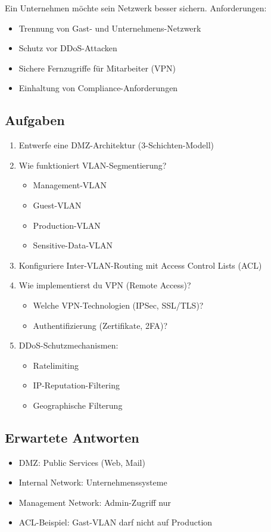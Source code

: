 \documentclass[12pt,a4paper,german]{report}
\begin{document}
Ein Unternehmen möchte sein Netzwerk besser sichern. Anforderungen:
\begin{itemize}
    \item Trennung von Gast- und Unternehmens-Netzwerk
    \item Schutz vor DDoS-Attacken
    \item Sichere Fernzugriffe für Mitarbeiter (VPN)
    \item Einhaltung von Compliance-Anforderungen
\end{itemize}

\subsection{Aufgaben}
\begin{enumerate}
    \item Entwerfe eine DMZ-Architektur (3-Schichten-Modell)
    \item Wie funktioniert VLAN-Segmentierung?
    \begin{itemize}
        \item Management-VLAN
        \item Guest-VLAN
        \item Production-VLAN
        \item Sensitive-Data-VLAN
    \end{itemize}
    \item Konfiguriere Inter-VLAN-Routing mit Access Control Lists (ACL)
    \item Wie implementierst du VPN (Remote Access)?
    \begin{itemize}
        \item Welche VPN-Technologien (IPSec, SSL/TLS)?
        \item Authentifizierung (Zertifikate, 2FA)?
    \end{itemize}
    \item DDoS-Schutzmechanismen:
    \begin{itemize}
        \item Ratelimiting
        \item IP-Reputation-Filtering
        \item Geographische Filterung
    \end{itemize}
\end{enumerate}

\subsection{Erwartete Antworten}
\begin{itemize}
    \item DMZ: Public Services (Web, Mail)
    \item Internal Network: Unternehmenssysteme
    \item Management Network: Admin-Zugriff nur
    \item ACL-Beispiel: Gast-VLAN darf nicht auf Production
\end{itemize}
\end{document}
